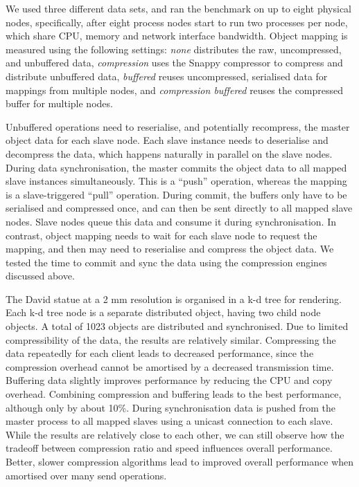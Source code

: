 We used three different data sets, and ran the benchmark on up to eight
physical nodes, specifically, after eight process nodes start to run two processes
per node, which share CPU, memory and network interface bandwidth. Object
mapping is measured using the following settings: {\em none} distributes the
raw, uncompressed, and unbuffered data, {\em compression} uses the Snappy
compressor to compress and distribute unbuffered data, {\em buffered} reuses
uncompressed, serialised data for mappings from multiple nodes, and
{\em compression buffered} reuses the compressed buffer for multiple nodes.

Unbuffered operations need to reserialise, and potentially recompress, the
master object data for each slave node. Each slave instance needs to
deserialise and decompress the data, which happens naturally in parallel on the
slave nodes. During data synchronisation, the master commits the object data to
all mapped slave instances simultaneously. This is a “push” operation, whereas
the mapping is a slave-triggered “pull” operation. During commit, the buffers
only have to be serialised and compressed once, and can then be sent directly
to all mapped slave nodes. Slave nodes queue this data and consume it during
synchronisation. In contrast, object mapping needs to wait for each slave node
to request the mapping, and then may need to reserialise and compress the
object data. We tested the time to commit and sync the data using the compression
engines discussed above.

The David statue at a 2 mm resolution is organised in a k-d tree for rendering.
Each k-d tree node is a separate distributed object, having two child node
objects. A total of 1023 objects are distributed and synchronised. Due to
limited compressibility of the data, the results are relatively similar.
Compressing the data repeatedly for each client leads to decreased performance,
since the compression overhead cannot be amortised by a decreased
transmission time. Buffering data slightly improves performance by reducing the
CPU and copy overhead. Combining compression and buffering leads to the best
performance, although only by about 10\%. During synchronisation data is
pushed from the master process to all mapped slaves using a unicast connection
to each slave. While the results are relatively close to each other, we can
still observe how the tradeoff between compression ratio and speed influences
overall performance. Better, slower compression algorithms lead to improved
overall performance when amortised over many send operations.

